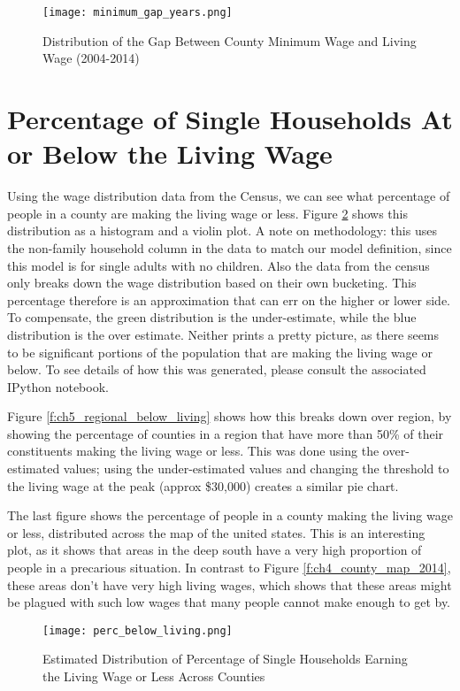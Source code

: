 \begin{figure}[H]
    \centering
        \texttt{[image: minimum\_gap\_years.png]}
        \caption{Distribution of the Gap Between County Minimum Wage and Living Wage (2004-2014)}
    \label{f:ch5_minimum_gap_years}
\end{figure}


\section{Percentage of Single Households At or Below the Living Wage}

Using the wage distribution data from the Census, we can see what percentage of people in a county are making the living wage or less. Figure \ref{f:ch5_perc_below_living} shows this distribution as a histogram and a violin plot. A note on methodology: this uses the non-family household column in the data to match our model definition, since this model is for single adults with no children. Also the data from the census only breaks down the wage distribution based on their own bucketing. This percentage therefore is an approximation that can err on the higher or lower side. To compensate, the green distribution is the under-estimate, while the blue distribution is the over estimate. Neither prints a pretty picture, as there seems to be significant portions of the population that are making the living wage or below. To see details of how this was generated, please consult the associated IPython notebook.

Figure \ref{f:ch5_regional_below_living} shows how this breaks down over region, by showing the percentage of counties in a region that have more than 50\% of their constituents making the living wage or less. This was done using the over-estimated values; using the under-estimated values and changing the threshold to the living wage at the peak (approx \$30,000) creates a similar pie chart.

The last figure shows the percentage of people in a county making the living wage or less, distributed across the map of the united states. This is an interesting plot, as it shows that areas in the deep south have a very high proportion of people in a precarious situation. In contrast to Figure \ref{f:ch4_county_map_2014}, these areas don't have very high living wages, which shows that these areas might be plagued with such low wages that many people cannot make enough to get by.

\begin{figure}[H]
    \centering
        \texttt{[image: perc\_below\_living.png]}
        \caption{Estimated Distribution of Percentage of Single Households Earning the Living Wage or Less Across Counties}
    \label{f:ch5_perc_below_living}
\end{figure}

